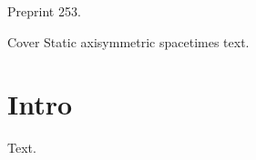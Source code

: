 \documentclass{article}
\def\title#1{#1}
\begin{document}
Preprint 253.
\begin{titlepage}
Cover \title{Static axisymmetric spacetimes} text.
\end{titlepage}
\section{Intro}
Text.
\end{document}

